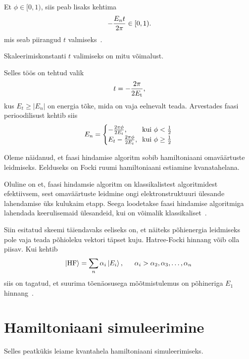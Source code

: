 \documentclass[12pt]{report}
\def\abs#1{\left|#1\right|}
\def\ket#1{\left|#1\right>}
\begin{document}
Et \(\phi \in [0, 1)\), siis peab lisaks kehtima
\begin{align}
    -\frac{E_n t}{2\pi} \in [0, 1) \rlap{.}
\end{align}
mis seab piirangud \(t\) valmiseks~\cite{whitfield+etal}.

Skaleerimiskonstanti \(t\) valimiseks on mitu võimalust.

Selles töös on tehtud valik
\begin{align}
    t = -\frac{2\pi}{2E_\mathrm{t}} \rlap{,}
\end{align}
kus \(E_t \ge \abs{E_n}\) on energia tõke, mida on vaja eelnevalt teada.
Arvestades faasi perioodilisust kehtib siis
\begin{align}
    E_n = \begin{cases}
        -\frac{2\pi\phi}{2E_t}\rlap{,} & \text{kui } \phi < \frac{1}{2} \\
        E_t - \frac{2\pi\phi}{2E_t}\rlap{,} & \text{kui } \phi \ge \frac{1}{2} \\
    \end{cases}
\end{align}

Oleme näidanud, et faasi hindamise algoritm sobib hamiltoniaani omaväärtuste leidmiseks.
Eelduseks on Focki ruumi hamiltoniaani estiamine kvanatahelana.

Oluline on et, faasi hindamsie algoritm on klassikalistest algoritmidest efektiivsem, sest omaväärtuste leidmine ongi elektronstruktuuri ülesande lahendamise üks kulukaim etapp.
Seega loodetakse faasi hindamise algoritmiga lahendada keerulisemaid ülesandeid, kui on võimalik klassikaliset~\cite{mcardle+etal, cao+etal}.

Siin esitatud skeemi täiendavaks eeliseks on, et näiteks põhienergia leidmiseks pole vaja teada põhioleku vektori täpset kuju.
Hatree-Focki hinnang võib olla piisav.
Kui kehtib
\begin{align}
    \ket{\text{HF}} = \sum_n \alpha_i \ket{E_i} \rlap{,}
    \qquad \alpha_i > \alpha_2, \alpha_3, \ldots, \alpha_n
\end{align}
siis on tagatud, et suurima tõenäosusega mõõtmistulemus on põhineriga \(E_1\) hinnang~\cite{whitfield+etal}.

\section{Hamiltoniaani simuleerimine}\label{sec:qcirc}

Selles peatkükis leiame kvantahela hamiltoniaani simuleerimiseks.
\end{document}
